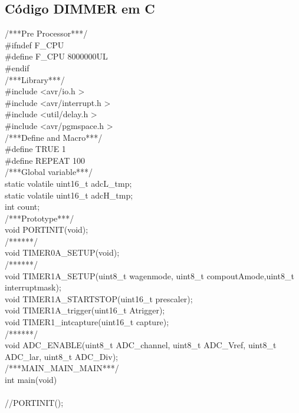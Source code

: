 \documentclass[titlepage, a4paper, 10pt, reqno, openany]{report}
\begin{document}
	\subsection {C\'{o}digo DIMMER em C}
\begin{minipage}[t]{.35\linewidth} 
\tiny
/***Pre Processor***/ \\
\#ifndef F\_CPU \\
\hspace*{.5cm}	\#define F\_CPU 8000000UL \\
\#endif \\
/***Library***/ \\
\#include \textless avr/io.h \textgreater \\
\#include \textless avr/interrupt.h \textgreater \\
\#include \textless util/delay.h \textgreater \\
\#include \textless avr/pgmspace.h \textgreater \\
/***Define and Macro***/ \\
\#define TRUE 1 \\
\#define REPEAT 100 \\
/***Global variable***/ \\
static volatile uint16\_t adcL\_tmp; \\
static volatile uint16\_t adcH\_tmp; \\
int count; \\
/***Prototype***/ \\
void PORTINIT(void); \\
/******/ \\
void TIMER0A\_SETUP(void); \\
/******/ \\
void TIMER1A\_SETUP(uint8\_t wagenmode, uint8\_t compoutAmode,uint8\_t interruptmask); \\
void TIMER1A\_STARTSTOP(uint16\_t prescaler); \\
void TIMER1A\_trigger(uint16\_t Atrigger); \\
void TIMER1\_intcapture(uint16\_t capture); \\
/******/ \\
void ADC\_ENABLE(uint8\_t ADC\_channel, uint8\_t ADC\_Vref, uint8\_t ADC\_lar, uint8\_t ADC\_Div); \\
/***MAIN\_MAIN\_MAIN***/ \\
int main(void) \\
\textbraceleft \\
\hspace*{.5cm}	//PORTINIT(); \\

\end{minipage}
\end{document}
